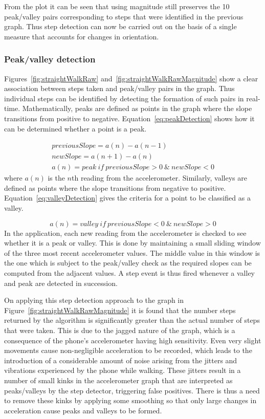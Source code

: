 \documentclass[12pt,a4paper]{report}
\begin{document}
From the plot it can be seen that using magnitude still preserves the 10 peak/valley pairs corresponding to steps that were identified in the previous graph. Thus step detection can now be carried out on the basis of a single measure that accounts for changes in orientation. 

\subsubsection{Peak/valley detection}

Figures~\ref{fig:straightWalkRaw} and~\ref{fig:straightWalkRawMagnitude} show a clear association between steps taken and peak/valley pairs in the graph. Thus individual steps can be identified by detecting the formation of such pairs in real-time. Mathematically, peaks are defined as points in the graph where the slope transitions from positive to negative. Equation~\ref{eq:peakDetection} shows how it can be determined whether a point is a peak. 

\begin{equation}\label{eq:peakDetection}
\begin{split}
previousSlope = a(n) - a(n-1) \\
newSlope = a(n+1) - a(n) \\
a(n) = peak\ if\ previousSlope > 0\ \&\ newSlope < 0
\end{split}
\end{equation}
where $a(n)$ is the $n$th reading from the accelerometer. Similarly, valleys are defined as points where the slope transitions from negative to positive. Equation~\ref{eq:valleyDetection} gives the criteria for a point to be classified as a valley. 

\begin{equation}\label{eq:valleyDetection}
a(n) = valley\ if\ previousSlope < 0\ \&\ newSlope > 0
\end{equation}
In the application, each new reading from the accelerometer is checked to see whether it is a peak or valley. This is done by maintaining a small sliding window of the three most recent accelerometer values. The middle value in this window is the one which is subject to the peak/valley check as the required slopes can be computed from the adjacent values. A step event is thus fired whenever a valley and peak are detected in succession.  

On applying this step detection approach to the graph in Figure~\ref{fig:straightWalkRawMagnitude} it is found that the number steps returned by the algorithm is significantly greater than the actual number of steps that were taken. This is due to the jagged nature of the graph, which is a consequence of the phone's accelerometer having high sensitivity. Even very slight movements cause non-negligible acceleration to be recorded, which leads to the introduction of a considerable amount of noise arising from the jitters and vibrations experienced by the phone while walking. These jitters result in a number of small kinks in the accelerometer graph that are interpreted as peaks/valleys by the step detector, triggering false positives. There is thus a need to remove these kinks by applying some smoothing so that only large changes in acceleration cause peaks and valleys to be formed.  
\end{document}

